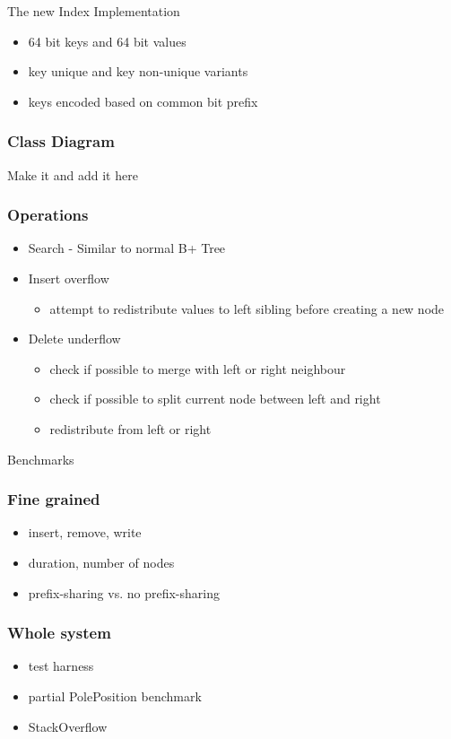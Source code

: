 \documentclass{beamer}
\begin{document}
\begin{section}{The new Index Implementation}
\begin{frame}
\begin{itemize}
        \item 64 bit keys and 64 bit values
        \item key unique and key non-unique variants
        \item keys encoded based on common bit prefix
      \end{itemize}
    \end{frame}
    \begin{frame}
        \frametitle{Class Diagram}
        Make it and add it here    
    \end{frame}
    \begin{frame}
        \frametitle{Operations}
        \begin{itemize}
        \item Search - Similar to normal B+ Tree
        \item Insert overflow
            \begin{itemize}
            \item attempt to redistribute values to left sibling before creating a new node
            \end{itemize}
        \item Delete underflow
            \begin{itemize}
            \item check if possible to merge with left or right neighbour
            \item check if possible to split current node between left and right
            \item redistribute from left or right
            \end{itemize}
        \end{itemize}
    \end{frame}
  \end{section}

  \begin{section}{Benchmarks}
    \begin{frame}
      \frametitle{Fine grained}
        \begin{itemize}
          \item insert, remove, write
          \item duration, number of nodes
          \item prefix-sharing vs. no prefix-sharing
        \end{itemize}
    \end{frame}
    \begin{frame}
      \frametitle{Whole system}
        \begin{itemize}
          \item test harness
          \item partial PolePosition benchmark
          \item StackOverflow
        \end{itemize}
    \end{frame}
  \end{section}
\end{document}
